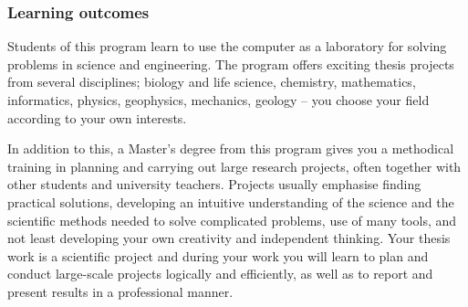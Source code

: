 \documentclass{beamer}
\begin{document}
\begin{frame}
\frametitle{Learning outcomes}

\begin{block}{}

Students of this program learn to use the computer as a laboratory for solving problems in science and engineering. The program offers exciting thesis projects from several disciplines; biology and life science, chemistry, mathematics, informatics, physics, geophysics, mechanics, geology  – you choose your  field according to your own interests.

In addition to this, a Master’s degree from this program gives you a
methodical training in planning and carrying out large research
projects, often together with other students and university
teachers. Projects usually emphasise finding practical solutions,
developing an intuitive understanding of the science and the
scientific methods needed to solve complicated problems, use of many
tools, and not least developing your own creativity and independent
thinking. Your thesis work is a scientific  project and during your work you will
learn to plan and conduct large-scale projects logically and efficiently, as well as
to report and present results in a professional manner.

\end{block}
\end{frame}
\end{document}
